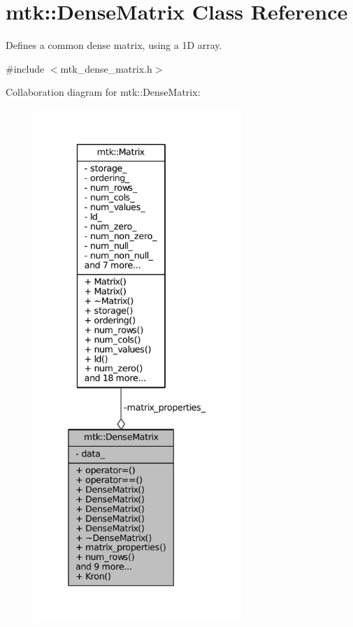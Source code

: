 \hypertarget{classmtk_1_1DenseMatrix}{\section{mtk\+:\+:Dense\+Matrix Class Reference}
\label{classmtk_1_1DenseMatrix}
}


Defines a common dense matrix, using a 1\+D array.  




{\ttfamily \#include $<$mtk\+\_\+dense\+\_\+matrix.\+h$>$}



Collaboration diagram for mtk\+:\+:Dense\+Matrix\+:\nopagebreak
\begin{figure}[H]
\begin{center}
\leavevmode
\includegraphics[height=550pt]{classmtk_1_1DenseMatrix__coll__graph}
\end{center}
\end{figure}
